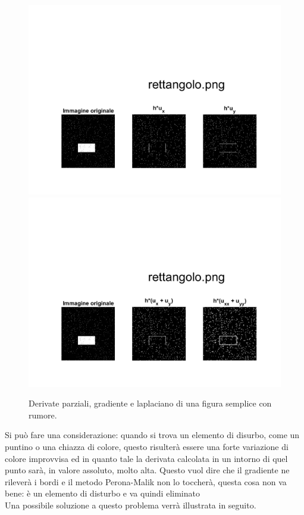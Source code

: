 \newpage
\begin{figure}   
\centering
\includegraphics[scale=0.4, trim = 0 0 0 10.5cm, clip]{Pictures/Risultati/rettangolo bianco e nero derivate parziali con rumore.png}
\includegraphics[scale=0.4, trim = 0 0 0 10.5cm, clip]{Pictures/Risultati/rettangolo bianco e nero gradiente e laplaciano con rumore.png}
\caption{Derivate parziali, gradiente e laplaciano di una figura semplice con rumore.}\label{fig:figura}
\end{figure}

Si può fare una considerazione: quando si trova un elemento di disurbo, come un puntino o una chiazza di colore, questo risulterà essere una forte variazione di colore improvvisa ed in quanto tale la derivata calcolata in un intorno di quel punto sarà, in valore assoluto, molto alta.
Questo vuol dire che il gradiente ne rileverà i bordi e il metodo Perona-Malik non lo toccherà, questa cosa non va bene: è un elemento di disturbo e va quindi eliminato\\ 
Una possibile soluzione a questo problema verrà illustrata in seguito.\newpage


